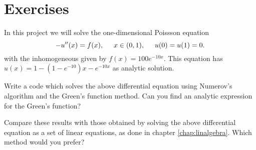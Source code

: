  \section{Exercises}
\begin{prob}
In this project we will solve the one-dimensional Poissson equation
\[
-u''(x) = f(x), \hspace{0.5cm} x\in(0,1), \hspace{0.5cm} u(0) = u(1) = 0.
\]
with the inhomogeneous given by
$f(x) = 100e^{-10x}$.  This equation has $u(x) = 1-(1-e^{-10})x-e^{-10x}$ 
as analytic solution.

Write a code which solves the above differential equation using Numerov's algorithm and the
Green's function method.   Can you find an analytic expression for the Green's function?

Compare these results with those obtained by solving the above differential equation as 
a set of linear equations, as done in chapter \ref{chap:linalgebra}. Which method would you prefer?

\end{prob}

